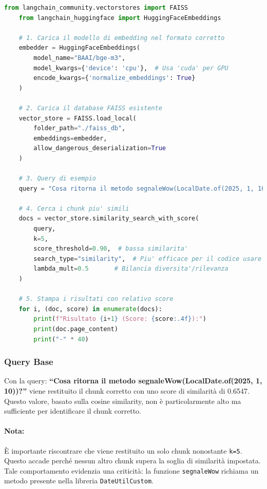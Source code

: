 \documentclass[12pt,a4paper,openright,twoside]{book}
\begin{document}
    \begin{lstlisting}[language=Python, caption={Esecuzione di una query sul database FAISS}, label={lst:query}]
    from langchain_community.vectorstores import FAISS
    from langchain_huggingface import HuggingFaceEmbeddings

    # 1. Carica il modello di embedding nel formato corretto
    embedder = HuggingFaceEmbeddings(
        model_name="BAAI/bge-m3",
        model_kwargs={'device': 'cpu'},  # Usa 'cuda' per GPU
        encode_kwargs={'normalize_embeddings': True}
    )

    # 2. Carica il database FAISS esistente
    vector_store = FAISS.load_local(
        folder_path="./faiss_db",
        embeddings=embedder,
        allow_dangerous_deserialization=True
    )

    # 3. Query di esempio
    query = "Cosa ritorna il metodo segnaleWow(LocalDate.of(2025, 1, 10))?"

    # 4. Cerca i chunk piu' simili
    docs = vector_store.similarity_search_with_score(
        query,
        k=5,
        score_threshold=0.90,  # bassa similarita'
        search_type="similarity",  # Piu' efficace per il codice usare mmr per diversita'
        lambda_mult=0.5       # Bilancia diversita'/rilevanza
    )

    # 5. Stampa i risultati con relativo score
    for i, (doc, score) in enumerate(docs):
        print(f"Risultato {i+1} (Score: {score:.4f}):")
        print(doc.page_content)
        print("-" * 40)
    \end{lstlisting}

    \subsubsection{Query Base}
    Con la query: 
    \newline
        \textbf{``Cosa ritorna il metodo segnaleWow(LocalDate.of(2025, 1, 10))?''}
    \newline
    viene restituito il chunk corretto con uno score di similarità di 0.6547. Questo valore, basato sulla cosine similarity, non è particolarmente alto ma sufficiente per identificare il chunk corretto.

    \paragraph{Nota:}
    È importante riscontrare che viene restituito un solo chunk nonostante \texttt{k=5}. Questo accade perché nessun altro chunk supera la soglia di similarità impostata. Tale comportamento evidenzia una criticità: la funzione \texttt{segnaleWow} richiama un metodo presente nella libreria \texttt{DateUtilCustom}.
\end{document}
